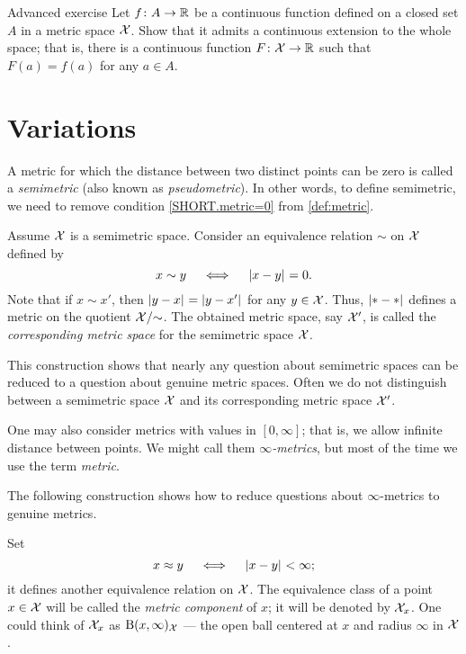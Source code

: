 \begin{thm}{Advanced exercise}\label{ex:tietze}
Let $f\colon A\to\mathbb{R}$ be a continuous function defined on a closed set $A$ in a metric space $\mathcal{X}$.
Show that it admits a continuous extension to the whole space;
that is, there is a continuous function $F\colon\mathcal{X}\to\mathbb{R}$ such that $F(a)=f(a)$ for any $a\in A$.
\end{thm}



\section{Variations}

A metric for which the distance between two distinct points can be zero is called a \emph{semimetric} (also known as \emph{pseudometric}).
In other words, to define semimetric, we need to remove condition \ref{SHORT.metric=0} from \ref{def:metric}.

Assume $\mathcal{X}$ is a semimetric space.
Consider an equivalence relation $\sim$ on $\mathcal{X}$ defined by
\[x\sim y\quad\iff\quad\dist{x}{y}{}=0.\] 
Note that if $x\sim x'$, then $\dist{y}{x}{}=\dist{y}{x'}{}$ for any $y\in\mathcal{X}$.
Thus, $\dist{*}{*}{}$ defines a metric on the
quotient $\mathcal{X}/{\sim}$.
The obtained metric space, say $\mathcal{X}'$, is called the 
\emph{corresponding metric space} for the semimetric space $\mathcal{X}$.
 

This construction shows that nearly any question about semimetric spaces can be reduced to a question about genuine metric spaces.
Often we do not distinguish between a semimetric space $\mathcal{X}$ and its corresponding metric space $\mathcal{X}'$.

One may also consider metrics with values in $[0,\infty]$;
that is, we allow infinite distance between points.
We might call them \emph{$\infty$-metrics}, but most of the time we use the term {}\emph{metric}.

The following construction shows how to reduce questions about $\infty$-metrics to genuine metrics. 

Set 
\[x\approx y\quad\iff\quad\dist{x}{y}{}<\infty;\]
it defines another equivalence relation on $\mathcal{X}$.
The equivalence class of a point $x\in\mathcal{X}$ will be called the \emph{metric component} 
 of $x$; it will be denoted by $\mathcal{X}_x$.
One could think of $\mathcal{X}_x$ as  $\mathrm{B}{}(x,\infty)_{\mathcal{X}}$ --- the open ball centered at $x$ and radius $\infty$ in $\mathcal{X}$.

